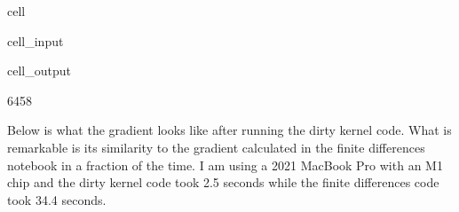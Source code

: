 \documentclass[letterpaper,10pt,english]{jupyterBook}
\begin{document}
\begin{sphinxuseclass}{cell}
\begin{sphinxVerbatimInput}
\begin{sphinxuseclass}{cell_input}
\begin{sphinxVerbatim}[commandchars=\\\{\}]
       
 
   
      
     
       
       \PYG{p}{[} \PYG{p}{]}    \PYG{p}{[} \PYG{p}{]}  
       \PYG{p}{[} \PYG{p}{]}    \PYG{p}{[} \PYG{p}{]}  

    

\end{sphinxVerbatim}

\end{sphinxuseclass}\end{sphinxVerbatimInput}
\begin{sphinxVerbatimOutput}

\begin{sphinxuseclass}{cell_output}
\begin{sphinxVerbatim}[commandchars=\\\{\}]
6458
\end{sphinxVerbatim}

\end{sphinxuseclass}\end{sphinxVerbatimOutput}

\end{sphinxuseclass}
\sphinxAtStartPar
Below is what the gradient looks like after running the dirty kernel code. What is remarkable is its similarity to the gradient calculated in the finite differences notebook in a fraction of the time. I am using a 2021 MacBook Pro with an M1 chip and the dirty kernel code took 2.5 seconds while the finite differences code took 34.4 seconds.
\end{document}
